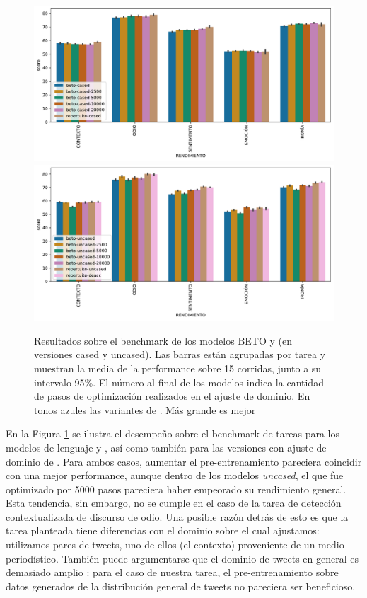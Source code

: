 \begin{figure}
    \centering
    \includegraphics[width=\textwidth]{img/robertuito/results_cased_models.pdf}
    \includegraphics[width=\textwidth]{img/robertuito/results_uncased_models.pdf}

    \caption{Resultados sobre el benchmark de los modelos BETO y \robertuito{} (en versiones cased y uncased). Las barras están agrupadas por tarea y muestran la media de la performance sobre 15 corridas, junto a su intervalo 95\%. El número al final de los modelos indica la cantidad de pasos de optimización realizados en el ajuste de dominio. En tonos azules las variantes de \robertuito{}. Más grande es mejor}
    \label{fig:robertuito_vs_domain_barplot_results}
\end{figure}


En la Figura \ref{fig:robertuito_vs_domain_barplot_results} se ilustra el desempeño sobre el benchmark de tareas para los modelos de lenguaje \beto{} y \robertuito{}, así como también para las versiones con ajuste de dominio de \beto{}. Para ambos casos, aumentar el pre-entrenamiento pareciera coincidir con una mejor performance, aunque dentro de los modelos \emph{uncased}, el que fue optimizado por \num{5000} pasos pareciera haber empeorado su rendimiento general. Esta tendencia, sin embargo, no se cumple en el caso de la tarea de detección contextualizada de discurso de odio. Una posible razón detrás de esto es que la tarea planteada tiene diferencias con el dominio sobre el cual ajustamos: utilizamos pares de tweets, uno de ellos (el contexto) proveniente de un medio periodístico. También puede argumentarse que el dominio de tweets en general es demasiado amplio \cite{eisenstein2013bad}: para el caso de nuestra tarea, el pre-entrenamiento sobre datos generados de la distribución general de tweets no pareciera ser beneficioso.




